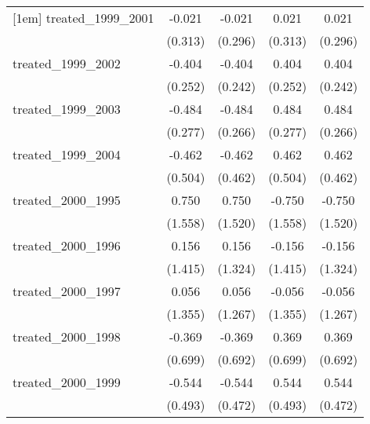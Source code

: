 {\begin{tabular}{l*{4}{c}}
[1em]
treated\_1999\_2001&      -0.021         &      -0.021         &       0.021         &       0.021         \\
            &     (0.313)         &     (0.296)         &     (0.313)         &     (0.296)         \\
[1em]
treated\_1999\_2002&      -0.404         &      -0.404         &       0.404         &       0.404         \\
            &     (0.252)         &     (0.242)         &     (0.252)         &     (0.242)         \\
[1em]
treated\_1999\_2003&      -0.484         &      -0.484         &       0.484         &       0.484         \\
            &     (0.277)         &     (0.266)         &     (0.277)         &     (0.266)         \\
[1em]
treated\_1999\_2004&      -0.462         &      -0.462         &       0.462         &       0.462         \\
            &     (0.504)         &     (0.462)         &     (0.504)         &     (0.462)         \\
[1em]
treated\_2000\_1995&       0.750         &       0.750         &      -0.750         &      -0.750         \\
            &     (1.558)         &     (1.520)         &     (1.558)         &     (1.520)         \\
[1em]
treated\_2000\_1996&       0.156         &       0.156         &      -0.156         &      -0.156         \\
            &     (1.415)         &     (1.324)         &     (1.415)         &     (1.324)         \\
[1em]
treated\_2000\_1997&       0.056         &       0.056         &      -0.056         &      -0.056         \\
            &     (1.355)         &     (1.267)         &     (1.355)         &     (1.267)         \\
[1em]
treated\_2000\_1998&      -0.369         &      -0.369         &       0.369         &       0.369         \\
            &     (0.699)         &     (0.692)         &     (0.699)         &     (0.692)         \\
[1em]
treated\_2000\_1999&      -0.544         &      -0.544         &       0.544         &       0.544         \\
            &     (0.493)         &     (0.472)         &     (0.493)         &     (0.472)         \\

\end{tabular}}
